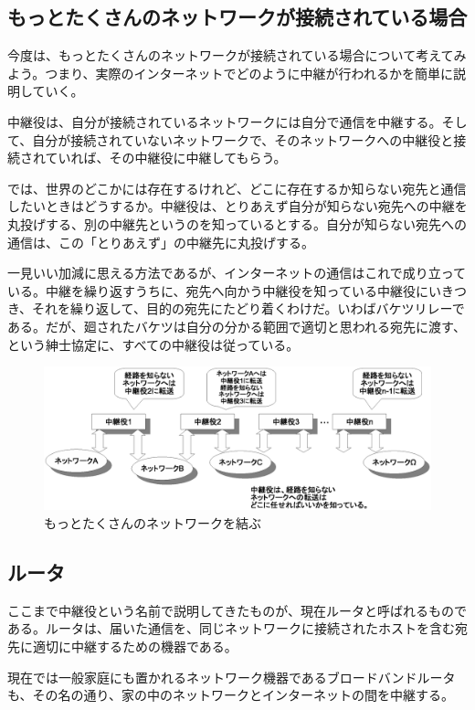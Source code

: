 \subsection{もっとたくさんのネットワークが接続されている場合}

今度は、もっとたくさんのネットワークが接続されている場合について考えてみよう。つまり、実際のインターネットでどのように中継が行われるかを簡単に説明していく。

中継役は、自分が接続されているネットワークには自分で通信を中継する。そして、自分が接続されていないネットワークで、そのネットワークへの中継役と接続されていれば、その中継役に中継してもらう。

では、世界のどこかには存在するけれど、どこに存在するか知らない宛先と通信したいときはどうするか。中継役は、とりあえず自分が知らない宛先への中継を丸投げする、別の中継先というのを知っているとする。自分が知らない宛先への通信は、この「とりあえず」の中継先に丸投げする。

一見いい加減に思える方法であるが、インターネットの通信はこれで成り立っている。中継を繰り返すうちに、宛先へ向かう中継役を知っている中継役にいきつき、それを繰り返して、目的の宛先にたどり着くわけだ。いわばバケツリレーである。だが、廻されたバケツは自分の分かる範囲で適切と思われる宛先に渡す、という紳士協定に、すべての中継役は従っている。

\begin{figure}[htbp]
	\includegraphics[width=12cm,clip]{draw/ip_basic4.eps}
	\caption{もっとたくさんのネットワークを結ぶ}
	\label{fig:ip_basic4}
\end{figure}

\subsection{ルータ}
ここまで中継役という名前で説明してきたものが、現在ルータと呼ばれるものである。ルータは、届いた通信を、同じネットワークに接続されたホストを含む宛先に適切に中継するための機器である。

現在では一般家庭にも置かれるネットワーク機器であるブロードバンドルータも、その名の通り、家の中のネットワークとインターネットの間を中継する。

